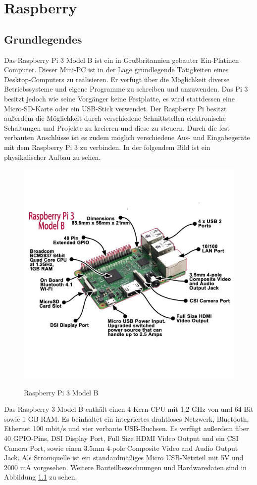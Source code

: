 \chapter{Raspberry}
\label{ch:Raspberry}
\section{Grundlegendes}
\label{sc:RPIGrund}
Das Raspberry Pi 3 Model B ist ein in Großbritannien gebauter Ein-Platinen Computer. Dieser Mini-PC ist in der Lage grundlegende Tätigkeiten eines Desktop-Computers zu realisieren. Er verfügt über die Möglichkeit diverse Betriebssysteme und eigene Programme zu schreiben und anzuwenden. Das Pi 3 besitzt jedoch wie seine Vorgänger keine Festplatte, es wird stattdessen eine Micro-SD-Karte oder ein USB-Stick verwendet. Der Raspberry Pi besitzt außerdem die Möglichkeit durch verschiedene Schnittstellen elektronische Schaltungen und Projekte zu kreieren und diese zu steuern. Durch die fest verbauten Anschlüsse ist es zudem möglich verschiedene Aus- und Eingabegeräte mit dem Raspberry Pi 3 zu verbinden. In der folgendem Bild ist ein physikalischer Aufbau zu sehen.
	\begin{figure}[H]
		\centering
		\includegraphics[width=1.0\textwidth]{images/raspberry_aufbau/raspberry_pi_3_model_b.jpg}
        \label{fig:raspberry_aufbau}
		\caption{Raspberry Pi 3 Model B}
	\end{figure}
Das Raspberry 3 Model B enthält einen 4-Kern-CPU mit 1,2 GHz von und 64-Bit sowie 1 GB RAM. Es beinhaltet ein integriertes drahtloses Netzwerk, Bluetooth, Ethernet 100 mbit/s und vier verbaute USB-Buchsen. Es verfügt außerdem über 40 GPIO-Pins, DSI Display Port, Full Size HDMI Video Output und ein CSI Camera Port, sowie einen 3.5mm 4-pole Composite Video and Audio Output Jack. Als Stromquelle ist ein standardmäßiges Micro USB-Netzteil mit 5V und 2000 mA vorgesehen. Weitere Bauteilbezeichnungen und Hardwaredaten sind in Abbildung \ref{fig:raspberry_aufbau} zu sehen.

